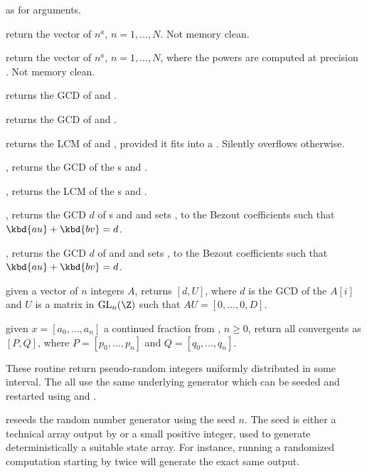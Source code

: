  as  for
 arguments.

 return the vector of $n^a$, $n = 1,
\dots, N$. Not memory clean.

 return the vector of $n^a$, $n
= 1, \dots, N$, where the powers are computed at precision . Not
memory clean.


 returns the GCD of  and .

 returns the GCD of  and .

 returns the LCM of  and ,
provided it fits into a . Silently overflows otherwise.

, returns the GCD of the s  and
.

, returns the LCM of the s  and
.

, returns the GCD $d$ of
s  and  and sets ,  to the Bezout
coefficients such that $\kbd{au} + \kbd{bv} = d$.

, returns the GCD
$d$ of  and  and sets ,  to the Bezout coefficients
such that $\kbd{au} + \kbd{bv} = d$.

 given a vector of $n$ integers $A$, returns $[d,
U]$, where $d$ is the GCD of the $A[i]$ and $U$ is a matrix
in $\text{GL}_n(\Z)$ such that $AU = [0,\dots,0,D]$.


 given $x = [a_0, ..., a_n]$ a
continued fraction from , $n\geq0$, return all
convergents as $[P,Q]$, where $P = [p_0,\dots,p_n]$ and $Q =
[q_0,\dots,q_n]$.

These routine return pseudo-random integers uniformly distributed in some
interval. The all use the same underlying generator which can be seeded and
restarted using  and .

 reseeds the random number generator using the
seed $n$. The seed is either a technical array output by 
or a small positive integer, used to generate deterministically a suitable
state array. For instance, running a randomized computation starting by
 twice will generate the exact same output.

